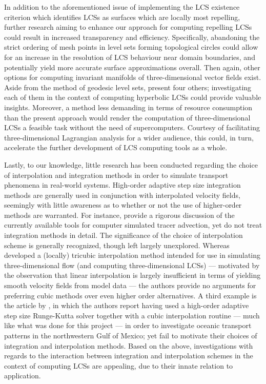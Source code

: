 In addition to the aforementioned issue of implementing the LCS existence
criterion which identifies LCSs as surfaces which are locally most repelling,
further research aiming to enhance our approach for computing repelling LCSs
could result in increased transparency and efficiency. Specifically,
abandoning the strict ordering of mesh points in level sets forming topological
circles could allow for an increase in the resolution of LCS behaviour near
domain boundaries, and potentially yield more accurate surface approximations
overall. Then again, other options for computing invariant manifolds of
three-dimensional vector fields exist. Aside from the method of geodesic level
sets, \textcite{krauskopf2005survey} present four others; investigating each of
them in the context of computing hyperbolic LCSs could provide valuable
insights. Moreover, a method less demanding in terms of resource
consumption than the present approach would render the computation of
three-dimensional LCSs a feasible task without the need of supercomputers.
Courtesy of facilitating three-dimensional Lagrangian analysis for a wider
audience, this could, in turn, accelerate the further development of LCS
computing tools as a whole.

Lastly, to our knowledge, little research has been conducted regarding the
choice of interpolation and integration methods in order to simulate transport
phenomena in real-world systems. High-order adaptive step size integration
methods are generally used in conjunction with interpolated velocity fields,
seemingly with little awareness as to whether or not the use of higher-order
methods are warranted. For instance, \textcite{vansebille2018lagrangian}
provide a rigorous discussion of the currently available tools for computer
simulated tracer advection, yet do not treat integration methods in detail.
The significance of the choice of interpolation scheme is generally recognized,
though left largely unexplored. Whereas \textcite{lekien2005tricubic} developed
a (locally) tricubic interpolation method intended for use in simulating
three-dimensional flow (and computing three-dimensional LCSs) --- motivated by
the observation that linear interpolation is largely insufficient in terms of
yielding smooth velocity fields from model data --- the authors provide no
arguments for preferring cubic methods over even higher order alternatives. A
third example is the article by \textcite{gough2017persistent}, in which the
authors report having used a high-order adaptive step size Runge-Kutta solver
together with a cubic interpolation routine --- much like what was done for
this project --- in order to investigate oceanic transport patterns in the
northwestern Gulf of Mexico; yet fail to motivate their choices of integration
and interpolation methods. Based on the above, investigations with regards to
the interaction between integration and interpolation schemes in the context
of computing LCSs are appealing, due to their innate relation to application.

